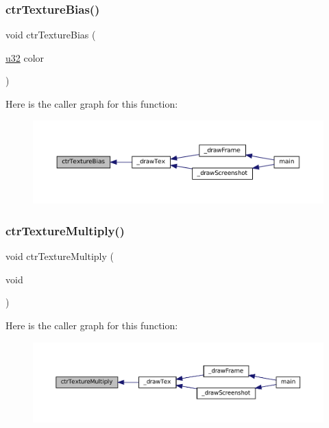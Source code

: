 \subsubsection{\texorpdfstring{ctr\+Texture\+Bias()}{ctrTextureBias()}}
{\footnotesize\ttfamily void ctr\+Texture\+Bias (\begin{DoxyParamCaption}\item[{\mbox{\hyperlink{sqlite3_8c_a03ad5adfaeb9b7640dde78a0cc390319}{u32}}}]{color }\end{DoxyParamCaption})}

Here is the caller graph for this function\+:
\nopagebreak
\begin{figure}[H]
\begin{center}
\leavevmode
\includegraphics[width=350pt]{ctr-gpu_8h_ae1021d5113537160c2b2122305ac6980_icgraph}
\end{center}
\end{figure}
\mbox{\label{ctr-gpu_8h_aa14fb1c5b08247737637c60db4c01b7c}} 
\subsubsection{\texorpdfstring{ctr\+Texture\+Multiply()}{ctrTextureMultiply()}}
{\footnotesize\ttfamily void ctr\+Texture\+Multiply (\begin{DoxyParamCaption}\item[{void}]{ }\end{DoxyParamCaption})}

Here is the caller graph for this function\+:
\nopagebreak
\begin{figure}[H]
\begin{center}
\leavevmode
\includegraphics[width=350pt]{ctr-gpu_8h_aa14fb1c5b08247737637c60db4c01b7c_icgraph}
\end{center}
\end{figure}
